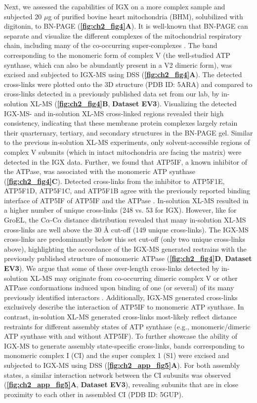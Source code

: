 Next, we assessed the capabilities of IGX on a more complex sample and subjected 20 $\mu$g of purified bovine heart mitochondria (BHM), solubilized with digitonin, to BN-PAGE (\textbf{\autoref{fig:ch2_fig4}A}). It is well-known that BN-PAGE can separate and visualize the different complexes of the mitochondrial respiratory chain, including many of the co-occurring super-complexes \cite{Schagger_2000}. The band corresponding to the monomeric form of complex V (the well-studied ATP synthase, which can also be abundantly present in a V2 dimeric form), was excised and subjected to IGX-MS using DSS (\textbf{\autoref{fig:ch2_fig4}A}). The detected cross-links were plotted onto the 3D structure (PDB ID: 5ARA) and compared to cross-links detected in a previously published data set from our lab, by in-solution XL-MS \cite{Liu_2018} (\textbf{\autoref{fig:ch2_fig4}B}, \textbf{Dataset EV3}). Visualizing the detected IGX-MS- and in-solution XL-MS cross-linked regions revealed their high consistency, indicating that these membrane protein complexes largely retain their quarternary, tertiary, and secondary structures in the BN-PAGE gel. Similar to the previous in-solution XL-MS experiments, only solvent-accessible regions of complex V subunits (which in intact mitochondria are facing the matrix) were detected in the IGX data. Further, we found that ATP5IF, a known inhibitor of the ATPase, was associated with the monomeric ATP synthase (\textbf{\autoref{fig:ch2_fig4}C}). Detected cross-links from the inhibitor to ATP5F1E, ATP5F1D, ATP5F1C, and ATP5F1B agree with the previously reported binding interface of ATP5IF of ATP5IF and the ATPase \cite{Gledhill_2007}. In-solution XL-MS resulted in a higher number of unique cross-links (248 vs. 53 for IGX). However, like for GroEL, the C$\alpha$-C$\alpha$ distance distribution revealed that many in-solution XL-MS cross-links are well above the 30 Å cut-off (149 unique cross-links). The IGX-MS cross-links are predominantly below this set cut-off (only two unique cross-links above), highlighting the accordance of the IGX-MS generated restrains with the previously published structure of monomeric ATPase (\textbf{\autoref{fig:ch2_fig4}D}, \textbf{Dataset EV3}). We argue that some of these over-length cross-links detected by in-solution XL-MS may originate from co-occurring dimeric complex V or other ATPase conformations induced upon binding of one (or several) of its many previously identified interactors \cite{Liu_2018, Ryl_2020, Schweppe_2017}. Additionally, IGX-MS generated cross-links exclusively describe the interaction of ATP5IF to monomeric ATP synthase. In contrast, in-solution XL-MS generated cross-links most-likely reflect distance restraints for different assembly states of ATP synthase (e.g., monomeric/dimeric ATP synthase with and without ATP5IF). To further showcase the ability of IGX-MS to generate assembly state-specific cross-links, bands corresponding to monomeric complex I (CI) and the super complex 1 (S1) were excised and subjected to IGX-MS using DSS (\textbf{\autoref{fig:ch2_app_fig5}A}). For both assembly states, a similar interaction network between the CI subunits was observed (\textbf{\autoref{fig:ch2_app_fig5}A}, \textbf{Dataset EV3}), revealing subunits that are in close proximity to each other in assembled CI (PDB ID: 5GUP). 